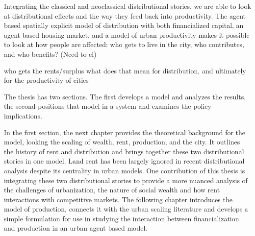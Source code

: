 Integrating the classical and neoclassical  distributional stories, we are able to look at distributional effects and the way they feed back into productivity. The agent based spatially explicit model of distribution with both financialized capital, an agent based housing market, and a model of urban productivity makes it possible to look at how people are affected: who gets to live in the city, who contributes, and who benefits? (Need to el)

who gets the rents/surplus what does that mean for distribution, and ultimately for the productivity of cities





The thesis has two sections. The first develops a model and analyzes the results, the second positions that model in a system and examines the policy implications.

In the first section,
the next chapter provides the theoretical background for the model, looking the scaling of wealth, rent, production, and the city. 
It outlines the history of rent and distribution and brings together these two distributional stories in one model. Land rent has been largely ignored in recent distributional analysis despite its centrality in urban models. One contribution of this thesis is integrating these two distributional stories to provide a more nuanced analysis of the challenges of urbanization, the nature of social wealth and how rent interactions with competitive markets. %
The following chapter introduces the model of production, connects it with the urban scaling literature and develops a simple formulation for use in studying the interaction between financialization and production in an urban agent based model.


